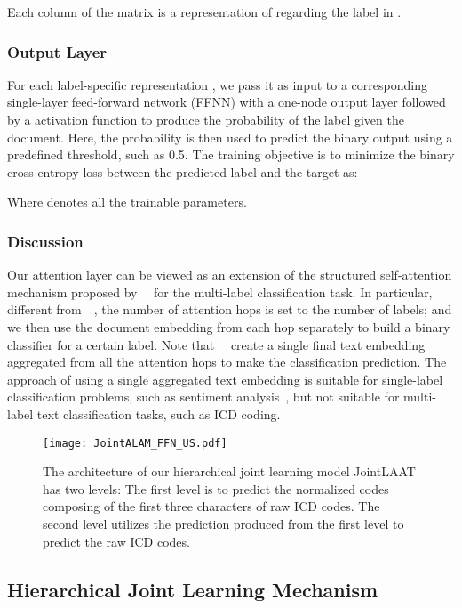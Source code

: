 \documentclass{article}
\begin{document}
Each  column  of  the matrix   is a representation of  regarding the  label in .


\subsubsection{Output Layer} For each label-specific representation  , we pass it as input to a corresponding  single-layer
feed-forward network (FFNN) with a one-node output layer followed by a  activation function to produce the probability of the  label given the document. Here, the probability is then used to predict the binary output  using a predefined threshold, such as 0.5. The training objective is to minimize the binary cross-entropy loss between the predicted label  and the target  as:


\noindent Where  denotes all the trainable parameters.


\subsubsection{Discussion}  Our attention layer can be viewed as an extension of the structured self-attention mechanism proposed by~\citeauthor{lin2017}~ for the multi-label classification task. In particular, different from~\citeauthor{lin2017}~, the number of attention hops is set to the number of labels; and we then use the document embedding from each hop separately to build a binary classifier for a certain label. Note that~\citeauthor{lin2017}~ create a single final text embedding aggregated from all the attention hops to make the classification prediction. The approach of using a single aggregated text embedding is suitable for single-label classification problems, such as sentiment analysis~\cite{lin2017}, but not suitable for multi-label text classification tasks, such as ICD coding. 


\begin{figure}[!t]
    \centering
    \texttt{[image: JointALAM\_FFN\_US.pdf]}
    \caption{The architecture of our hierarchical joint learning  model JointLAAT has two levels: The first level is to predict the normalized codes composing of the first three characters of raw ICD codes. The second level utilizes the prediction produced from the first level to predict the raw ICD codes.}
    \label{fig:JointALAM}
\end{figure}


\subsection{Hierarchical Joint Learning Mechanism}
\end{document}
